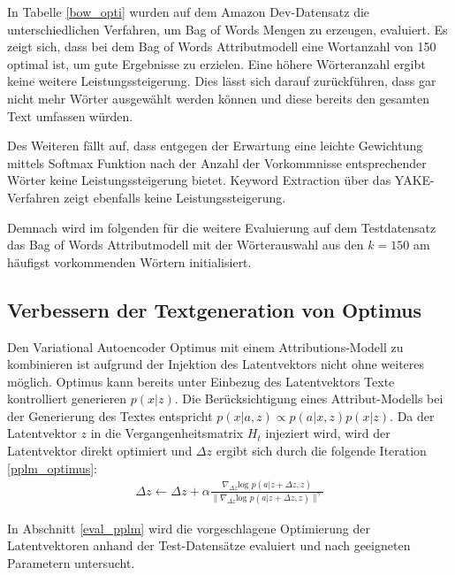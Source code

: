 In Tabelle \ref{bow_opti} wurden auf dem Amazon Dev-Datensatz die unterschiedlichen Verfahren, um Bag of Words Mengen zu erzeugen, evaluiert.
Es zeigt sich, dass bei dem Bag of Words Attributmodell eine Wortanzahl von 150 optimal ist, um gute Ergebnisse zu erzielen. 
Eine höhere Wörteranzahl ergibt keine weitere Leistungssteigerung. Dies lässt sich darauf zurückführen, dass gar nicht mehr Wörter ausgewählt werden können und diese bereits den gesamten Text umfassen würden.

Des Weiteren fällt auf, dass entgegen der Erwartung eine leichte Gewichtung mittels Softmax Funktion nach der Anzahl der Vorkommnisse entsprechender Wörter keine Leistungssteigerung bietet.
Keyword Extraction über das YAKE-Verfahren zeigt ebenfalls keine Leistungssteigerung. 

Demnach wird im folgenden für die weitere Evaluierung auf dem Testdatensatz das Bag of Words Attributmodell mit der Wörterauswahl aus den $k=150$ am häufigst vorkommenden Wörtern initialisiert.

\subsection{Verbessern der Textgeneration von Optimus}
Den Variational Autoencoder Optimus mit einem Attributions-Modell zu kombinieren ist aufgrund der Injektion des Latentvektors nicht ohne weiteres möglich.
Optimus kann bereits unter Einbezug des Latentvektors Texte kontrolliert generieren $p(x|z)$.
Die Berücksichtigung eines Attribut-Modells bei der Generierung des Textes entspricht $p(x|a,z) \propto p(a|x,z)p(x|z)$. %
Da der Latentvektor $z$ in die Vergangenheitsmatrix $H_t$ injeziert wird, wird der Latentvektor direkt optimiert und $\Delta z$ ergibt sich durch die folgende Iteration \ref{pplm_optimus}:
\begin{align}
    \label{pplm_optimus}
    \Delta z \leftarrow \Delta z + \alpha \frac{\nabla_{\Delta z} \text{log }p(a|z+\Delta z,z)}{\| \nabla_{\Delta z} \text{log }p(a|z+\Delta z,z)\|^\gamma}
\end{align}

In Abschnitt \ref*{eval_pplm} wird die vorgeschlagene Optimierung der Latentvektoren anhand der Test-Datensätze evaluiert und nach geeigneten Parametern untersucht.


